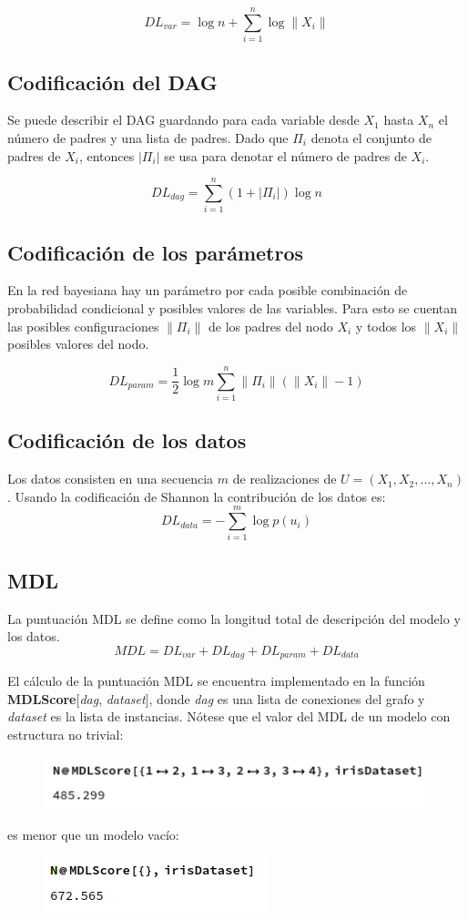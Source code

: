 \documentclass[10pt,a4paper]{article}
\begin{document}
\[
	DL_{var} = \log n + \sum_{i=1}^n \log \| X_i \|
\]

\subsection{Codificación del DAG}
Se puede describir el DAG guardando para cada variable desde $X_1$ hasta $X_n$ el número de padres y una lista de padres. Dado que $\Pi_i$ denota el conjunto de padres de $X_i$, entonces $|\Pi_i|$ se usa para denotar el número de padres de $X_i$. 

\[
	DL_{dag} = \sum_{i=1}^n \left( 1 + |\Pi_i| \right) \log n
\]

\subsection{Codificación de los parámetros}
En la red bayesiana hay un parámetro por cada posible combinación de probabilidad condicional y posibles valores de las variables. Para esto se cuentan las posibles configuraciones $\| \Pi_i \|$ de los padres del nodo $X_i$ y todos los $\| X_i \|$ posibles valores del nodo.

\[
	DL_{param} = \frac{1}{2} \log m \sum_{i=1}^n \| \Pi_i \| \left( \| X_i \| - 1 \right)
\]

\subsection{Codificación de los datos}
Los datos consisten en una secuencia $m$ de realizaciones de $U = \left( X_1, X_2, \dots, X_n \right)$. Usando la codificación de Shannon la contribución de los datos es:
\[
	DL_{data} = - \sum_{i=1}^m \log p(u_i)
\]

\subsection{MDL}
La puntuación MDL se define como la longitud total de descripción del modelo y los datos.
\[
	MDL = DL_{var} + DL_{dag} + DL_{param} + DL_{data}
\]

El cálculo de la puntuación MDL se encuentra implementado en la función \textbf{MDLScore}[\textit{dag}, \textit{dataset}], donde \textit{dag} es una lista de conexiones del grafo y \textit{dataset} es la lista de instancias. Nótese que el valor del MDL de un modelo con estructura no trivial:
\begin{figure}[H]
\centering
    \includegraphics[scale=0.45]{img/iris_mdl.png}
\end{figure}
es menor que un modelo vacío:
\begin{figure}[H]
\centering
    \includegraphics[scale=0.45]{img/iris_mdl_empty.png}
\end{figure}
\end{document}

